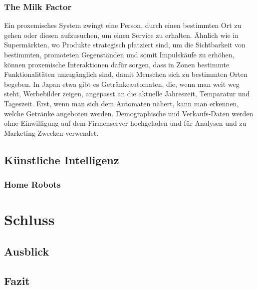 \documentclass[a4paper]{article}
\begin{document}
\subsubsection{The Milk Factor}
Ein proxemisches System zwingt eine Person, durch einen bestimmten Ort zu gehen oder diesen aufzusuchen, um einen Service zu erhalten.\newline
Ähnlich wie in Supermärkten, wo Produkte strategisch platziert sind, um die Sichtbarkeit von bestimmten, promoteten Gegenständen und somit Impulskäufe zu erhöhen, können proxemische Interaktionen dafür sorgen, dass in Zonen bestimmte Funktionalitäten unzugänglich sind, damit Menschen sich zu bestimmten Orten begeben.\newline
In Japan etwa gibt es Getränkeautomaten, die, wenn man weit weg steht, Werbebilder zeigen, angepasst an die aktuelle Jahreszeit, Temparatur und Tageszeit. Erst, wenn man sich dem Automaten nähert, kann man erkennen, welche Getränke angeboten werden. Demographische und Verkaufs-Daten werden ohne Einwilligung auf dem Firmenserver hochgeladen und für Analysen und zu Marketing-Zwecken verwendet.


\subsection{Künstliche Intelligenz}
\label{sub:kuenstliche_intelligenz}

\subsubsection{Home Robots}
\label{sub:home_robots}

\section{Schluss}
\label{sec:schluss}

\subsection{Ausblick}
\label{sub:ausblick}

\subsection{Fazit}
\label{sub:fazit}


\newpage


\printbibliography

%

%
\end{document}
